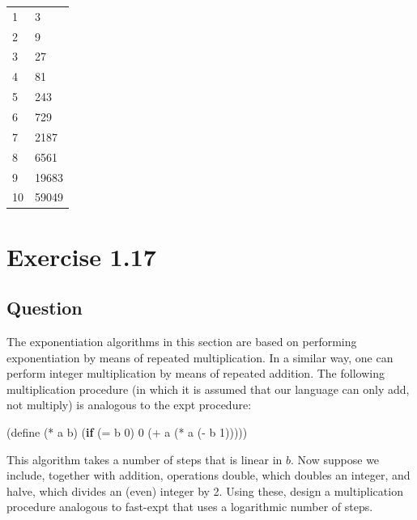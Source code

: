 \documentclass[
]{article}
\newenvironment{Shaded}{}{}
\newcommand{\DecValTok}[1]{\textcolor[rgb]{0.25,0.63,0.44}{#1}}
\newcommand{\ExtensionTok}[1]{#1}
\newcommand{\FunctionTok}[1]{\textcolor[rgb]{0.02,0.16,0.49}{#1}}
\newcommand{\KeywordTok}[1]{\textcolor[rgb]{0.00,0.44,0.13}{\textbf{#1}}}
\newcommand{\NormalTok}[1]{#1}
\newcommand{\OperatorTok}[1]{\textcolor[rgb]{0.40,0.40,0.40}{#1}}
\begin{document}
\begin{longtable}[]{@{}ll@{}}
\toprule
\endhead
1 & 3 \\
2 & 9 \\
3 & 27 \\
4 & 81 \\
5 & 243 \\
6 & 729 \\
7 & 2187 \\
8 & 6561 \\
9 & 19683 \\
10 & 59049 \\
\bottomrule
\end{longtable}

\hypertarget{exercise-1.17}{%
\section{Exercise 1.17}\label{exercise-1.17}}

\hypertarget{question-15}{%
\subsection{Question}\label{question-15}}

The exponentiation algorithms in this section are based on performing
exponentiation by means of repeated multiplication. In a similar way,
one can perform integer multiplication by means of repeated addition.
The following multiplication procedure (in which it is assumed that our
language can only add, not multiply) is analogous to the expt procedure:

\begin{Shaded}
\begin{Highlighting}[numbers=left,,]
\NormalTok{(}\ExtensionTok{define}\FunctionTok{ }\NormalTok{(}\OperatorTok{*}\NormalTok{ a b)}
\NormalTok{  (}\KeywordTok{if}\NormalTok{ (}\OperatorTok{=}\NormalTok{ b }\DecValTok{0}\NormalTok{)}
      \DecValTok{0}
\NormalTok{      (}\OperatorTok{+}\NormalTok{ a (}\OperatorTok{*}\NormalTok{ a (}\OperatorTok{{-}}\NormalTok{ b }\DecValTok{1}\NormalTok{)))))}
\end{Highlighting}
\end{Shaded}

This algorithm takes a number of steps that is linear in \( b \). Now
suppose we include, together with addition, operations double, which
doubles an integer, and halve, which divides an (even) integer by 2.
Using these, design a multiplication procedure analogous to fast-expt
that uses a logarithmic number of steps.
\end{document}
